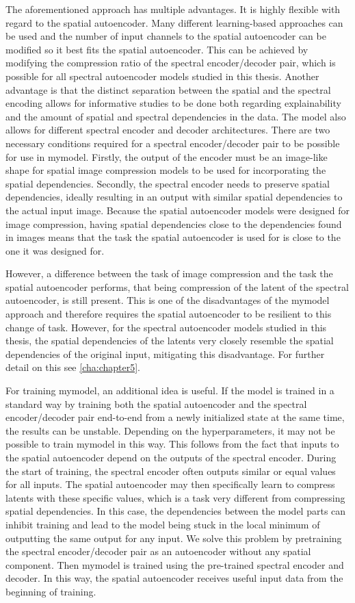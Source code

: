 The aforementioned approach has multiple advantages. It is highly flexible with regard to the spatial autoencoder. Many different learning-based approaches can be used and the number of input channels to the spatial autoencoder can be modified so it best fits the spatial autoencoder. This can be achieved by modifying the compression ratio of the spectral encoder/decoder pair, which is possible for all spectral autoencoder models studied in this thesis. Another advantage is that the distinct separation between the spatial and the spectral encoding allows for informative studies to be done both regarding explainability and the amount of spatial and spectral dependencies in the data. The model also allows for different spectral encoder and decoder architectures. There are two necessary conditions required for a spectral encoder/decoder pair to be possible for use in \ac{mymodel}. Firstly, the output of the encoder must be an image-like shape for spatial image compression models to be used for incorporating the spatial dependencies. Secondly, the spectral encoder needs to preserve spatial dependencies, ideally resulting in an output with similar spatial dependencies to the actual input image. Because the spatial autoencoder models were designed for image compression, having spatial dependencies close to the dependencies found in images means that the task the spatial autoencoder is used for is close to the one it was designed for.

However, a difference between the task of image compression and the task the spatial autoencoder performs, that being compression of the latent of the spectral autoencoder, is still present. This is one of the disadvantages of the \ac{mymodel} approach and therefore requires the spatial autoencoder to be resilient to this change of task. However, for the spectral autoencoder models studied in this thesis, the spatial dependencies of the latents very closely resemble the spatial dependencies of the original input, mitigating this disadvantage. For further detail on this see \autoref{cha:chapter5}.

For training \ac{mymodel}, an additional idea is useful. If the model is trained in a standard way by training both the spatial autoencoder and the spectral encoder/decoder pair end-to-end from a newly initialized state at the same time, the results can be unstable. Depending on the hyperparameters, it may not be possible to train \ac{mymodel} in this way. This follows from the fact that inputs to the spatial autoencoder depend on the outputs of the spectral encoder. During the start of training, the spectral encoder often outputs similar or equal values for all inputs. The spatial autoencoder may then specifically learn to compress latents with these specific values, which is a task very different from compressing spatial dependencies. In this case, the dependencies between the model parts can inhibit training and lead to the model being stuck in the local minimum of outputting the same output for any input. We solve this problem by pretraining the spectral encoder/decoder pair as an autoencoder without any spatial component. Then \ac{mymodel} is trained using the pre-trained spectral encoder and decoder. In this way, the spatial autoencoder receives useful input data from the beginning of training. 

